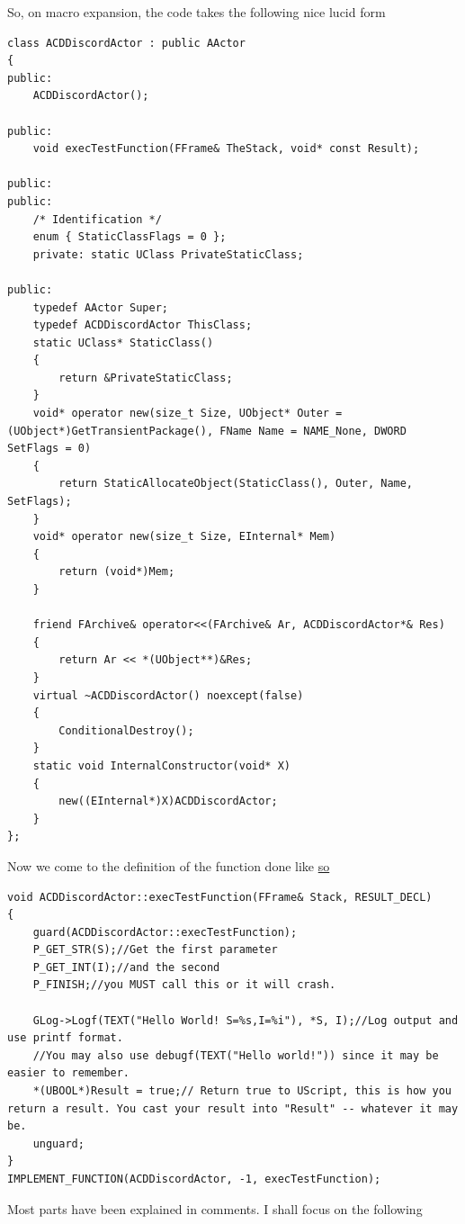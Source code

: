 \documentclass{article}
\theoremstyle{definition}
\begin{document}
So, on macro expansion, the code takes the following nice lucid form

\lstset{language=C++}
\begin{lstlisting}[frame=single]
class ACDDiscordActor : public AActor
{
public:
	ACDDiscordActor();

public:
	void execTestFunction(FFrame& TheStack, void* const Result);

public:
public: 
	/* Identification */
	enum { StaticClassFlags = 0 };
	private: static UClass PrivateStaticClass; 

public:
	typedef AActor Super;
	typedef ACDDiscordActor ThisClass;
	static UClass* StaticClass()
	{
		return &PrivateStaticClass; 
	}
	void* operator new(size_t Size, UObject* Outer = (UObject*)GetTransientPackage(), FName Name = NAME_None, DWORD SetFlags = 0)
	{
		return StaticAllocateObject(StaticClass(), Outer, Name, SetFlags); 
	}
	void* operator new(size_t Size, EInternal* Mem)
	{
		return (void*)Mem;
	}

	friend FArchive& operator<<(FArchive& Ar, ACDDiscordActor*& Res)
	{ 
		return Ar << *(UObject**)&Res; 
	}
	virtual ~ACDDiscordActor() noexcept(false)
	{
		ConditionalDestroy(); 
	}
	static void InternalConstructor(void* X)
	{
		new((EInternal*)X)ACDDiscordActor;
	}
};
\end{lstlisting}

Now we come to the definition of the function done like \href{https://github.com/ravimohan1991/ChatDiamond/blob/5592fef2b13305e441c1dd2b09dde7dd52ff2d83/UTNativeEssentials/ChatDiamond/Src/ChatDiamondNative.cpp#L43}{so}

\lstset{language=C++}
\begin{lstlisting}[frame=single]
void ACDDiscordActor::execTestFunction(FFrame& Stack, RESULT_DECL)
{
	guard(ACDDiscordActor::execTestFunction);
	P_GET_STR(S);//Get the first parameter
	P_GET_INT(I);//and the second
	P_FINISH;//you MUST call this or it will crash.

	GLog->Logf(TEXT("Hello World! S=%s,I=%i"), *S, I);//Log output and use printf format.
	//You may also use debugf(TEXT("Hello world!")) since it may be easier to remember.
	*(UBOOL*)Result = true;// Return true to UScript, this is how you return a result. You cast your result into "Result" -- whatever it may be.
	unguard;
}
IMPLEMENT_FUNCTION(ACDDiscordActor, -1, execTestFunction);
\end{lstlisting}

Most parts have been explained in comments.  I shall focus on the following
\end{document}
